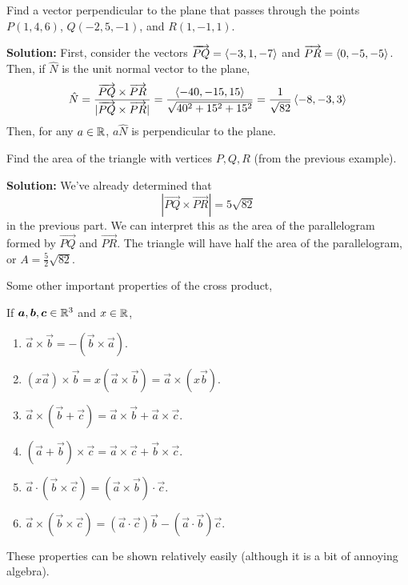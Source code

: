 \begin{example}
    Find a vector perpendicular to the plane that passes through the points \(P(1,4,6)\), \(Q(-2,5,-1)\), and \(R(1,-1,1)\). \par \textbf{Solution:} First, consider the vectors \(\overrightarrow{PQ}=\left\langle-3, 1, -7\right\rangle\) and \(\overrightarrow{PR}=\left\langle0,-5,-5\right\rangle\). Then, if \(\hat N\) is the unit normal vector to the plane, 
    \[ \hat N = \frac{\overrightarrow{PQ}\times\overrightarrow{PR}}{|\overrightarrow{PQ}\times\overrightarrow{PR}|}=\frac{\left\langle-40, -15, 15\right\rangle}{\sqrt{40^2+15^2+15^2}}=\frac{1}{\sqrt{82}}\left\langle-8, -3, 3\right\rangle \] 
    Then, for any \(a\in\mathbb{R}\), \(a\hat N\) is perpendicular to the plane.
\end{example}
\begin{example}
    Find the area of the triangle with vertices \(P, Q, R\) (from the previous example). \par 
    \textbf{Solution:} We've already determined that \[|\overrightarrow{PQ}\times\overrightarrow{PR}|=5\sqrt{82}\] in the previous part. We can interpret this as the area of the parallelogram formed by \(\overrightarrow{PQ}\) and \(\overrightarrow{PR}\). The triangle will have half the area of the parallelogram, or \(A=\frac{5}{2}\sqrt{82}\).
\end{example}
Some other important properties of the cross product,
\begin{theorem}
    If \(\boldsymbol{a}, \boldsymbol{b}, \boldsymbol{c}\in \mathbb{R}^3\) and \(x\in\mathbb{R}\),
    \begin{enumerate}
        \item \(\vec a \times \vec b = -(\vec b\times \vec a)\). 
        \item \((x\vec a)\times \vec b = x(\vec a \times \vec b)= \vec a \times (x\vec b)\).
        \item \(\vec a \times (\vec b + \vec c) = \vec a \times \vec b + \vec a \times \vec c\).
        \item \((\vec a + \vec b)\times \vec c = \vec a \times \vec c + \vec b \times \vec c\).
        \item \(\vec a \cdot (\vec b \times \vec c) = (\vec a \times \vec b)\cdot \vec c\).
        \item \(\vec a \times (\vec b \times \vec c) = (\vec a \cdot \vec c)\vec b - (\vec a \cdot \vec b)\vec c\).
    \end{enumerate}
\end{theorem}
These properties can be shown relatively easily (although it is a bit of annoying algebra). \par
